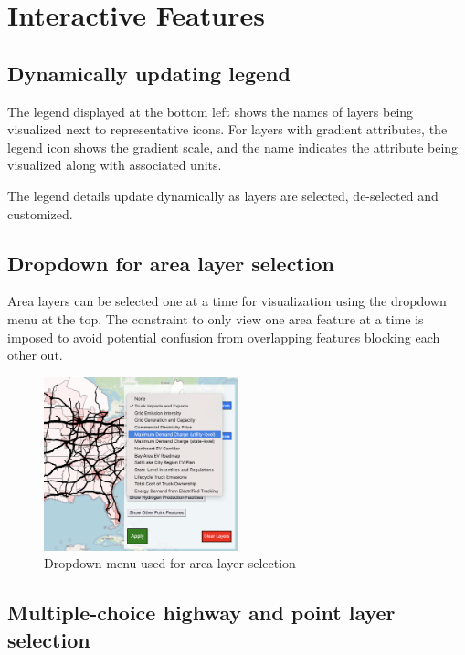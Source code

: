 \section{Interactive Features}
\label{sec:interactive_features}

\subsection{Dynamically updating legend}

The legend displayed at the bottom left shows the names of layers being visualized next to representative icons. For layers with gradient attributes, the legend icon shows the gradient scale, and the name indicates the attribute being visualized along with associated units. 

The legend details update dynamically as layers are selected, de-selected and customized.

\subsection{Dropdown for area layer selection}

Area layers can be selected one at a time for visualization using the dropdown menu at the top. The constraint to only view one area feature at a time is imposed to avoid potential confusion from overlapping features blocking each other out. 

\begin{figure}[ht]
        \centering
        \includegraphics[width=0.5\textwidth]{figures/dropdown_area.png}
        \caption{Dropdown menu used for area layer selection}
        \label{fig:dropdown_area}
\end{figure}

\subsection{Multiple-choice highway and point layer selection}

